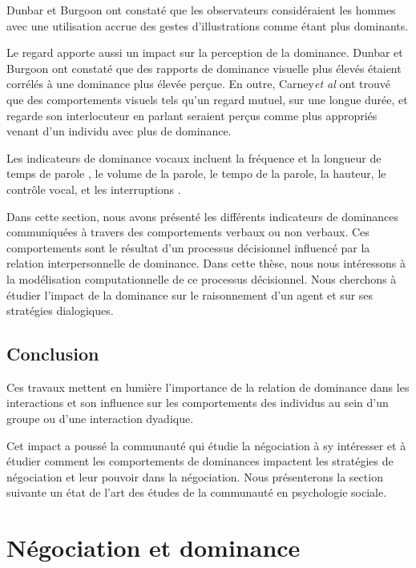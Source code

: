 				Dunbar et Burgoon \cite{dunbar2005perceptions} ont constaté que les observateurs considéraient les hommes avec une utilisation accrue des gestes d'illustrations comme étant plus dominants.
				
				Le regard apporte aussi un impact sur la perception de la dominance. Dunbar et Burgoon \cite{dunbar2005perceptions} ont constaté que des rapports de dominance visuelle plus élevés étaient corrélés à une dominance plus élevée perçue. En outre, Carney\emph{et al} \cite{hall2005nonverbal} ont trouvé que des comportements visuels tels qu'un regard mutuel, sur une longue durée, et regarde son interlocuteur en parlant seraient perçus comme plus appropriés venant d'un individu avec plus de dominance.
				
				Les indicateurs de dominance vocaux incluent la fréquence et la longueur de temps de parole \cite{mast2002dominance}, le volume de la parole, le tempo de la parole, la hauteur, le contrôle vocal, et les interruptions \cite{dunbar2005perceptions}.
				
				Dans cette section, nous avons présenté les différents indicateurs de dominances communiquées à travers des comportements verbaux ou non verbaux. Ces comportements sont le résultat d'un processus décisionnel influencé par la relation interpersonnelle de dominance. Dans cette thèse, nous nous intéressons à la modélisation computationnelle de ce processus décisionnel. Nous cherchons à étudier l'impact de la dominance sur le raisonnement d'un agent et sur ses stratégies dialogiques.
				
				
			
			\subsection{Conclusion}
				
				Ces travaux mettent en lumière l'importance de la relation de dominance dans les interactions et son influence sur les comportements des individus au sein d'un groupe ou d'une interaction dyadique.
				
				Cet impact a poussé la communauté qui étudie la négociation à sy intéresser et à étudier comment les comportements de dominances impactent les stratégies de négociation et leur pouvoir dans la négociation. 
				Nous présenterons la section suivante un état de l'art des études de la communauté en psychologie sociale.
				
		\section{Négociation et dominance}  \label{sec:domNego}
		
